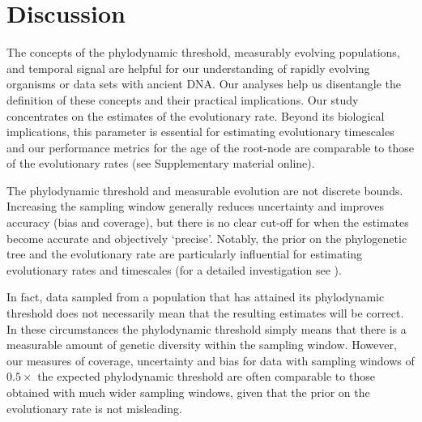 \documentclass[11pt]{article}
\begin{document}
\section{Discussion}
The concepts of the phylodynamic threshold, measurably evolving populations, and temporal signal are helpful for our understanding of rapidly evolving organisms or data sets with ancient DNA. Our analyses help us disentangle the definition of these concepts and their practical implications. Our study concentrates on the estimates of the evolutionary rate. Beyond its biological implications, this parameter is essential for estimating evolutionary timescales and our performance metrics for the age of the root-node are comparable to those of the evolutionary rates (see Supplementary material online).

The phylodynamic threshold and measurable evolution are not discrete bounds. Increasing the sampling window generally reduces uncertainty and improves accuracy (bias and coverage), but there is no clear cut-off for when the estimates become accurate and objectively `precise'. Notably, the prior on the phylogenetic tree and the evolutionary rate are particularly influential for estimating evolutionary rates and timescales (for a detailed investigation see \cite{tay2024assessing}). 

In fact, data sampled from a population that has attained its phylodynamic threshold does not necessarily mean that the resulting estimates will be correct. In these circumstances the phylodynamic threshold simply means that there is a measurable amount of genetic diversity within the sampling window. However, our measures of coverage, uncertainty and bias for data with sampling windows of $0.5\times$ the expected phylodynamic threshold are often comparable to those obtained with much wider sampling windows, given that the prior on the evolutionary rate is not misleading. 
\end{document}
